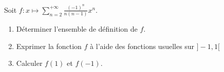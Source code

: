 \documentclass[a4paper,twoside,french,11pt]{VcCours}
\begin{document}
%

\begin{Exercice}{} Soit $f : x \mapsto \sum_{n = 2}^{ + \infty} \frac{( - 1)^{n}}{n(n - 1)}x^{n}.$

  \begin{enumerate}
  \item
    Déterminer l'ensemble de définition de $f$.
  \item
    Exprimer la fonction $f$ à l'aide des fonctions usuelles sur $] - 1,1[$
  \item Calculer $f(1)$ et $f( - 1)$.
  \end{enumerate}
  \end{Exercice} 
  
\end{document}
